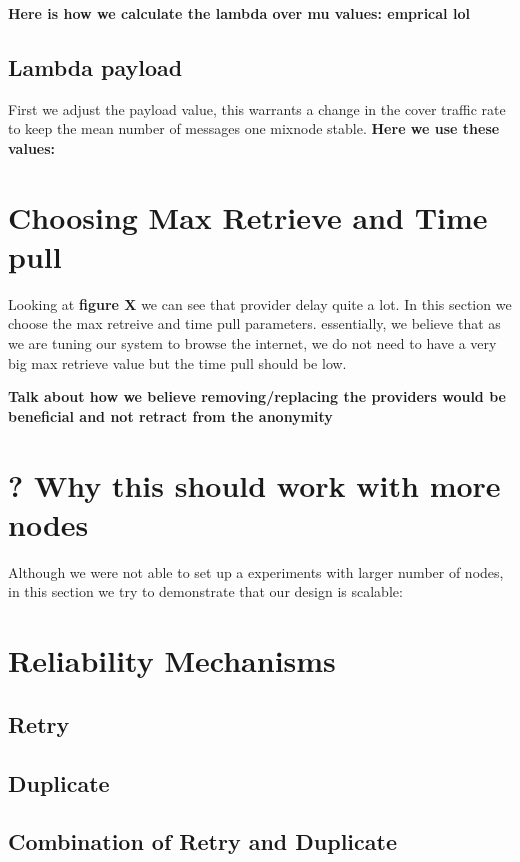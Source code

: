 \documentclass[a4paper,11pt,oneside]{report}
\begin{document}
\textbf{Here is how we calculate the lambda over mu values: emprical lol}
\subsection{Lambda payload}

First we adjust the payload value, this warrants a change in the cover traffic rate to keep the mean number of messages one mixnode stable. \textbf{Here we use these values: }





\section{Choosing Max Retrieve and Time pull}

Looking at \textbf{figure X} we can see that provider delay quite a lot.
In this section we choose the max retreive and time pull parameters. essentially, we believe that as we are tuning our system to browse the internet, we do not need to have a very big max retrieve value but the time pull should be low.

\textbf{Talk about how we believe removing/replacing the providers would be beneficial and not retract from the anonymity}

\section{? Why this should work with more nodes}
Although we were not able to set up a experiments with larger number of nodes, in this section we try to demonstrate that our design is scalable:

\section{Reliability Mechanisms}

\subsection{Retry}

\subsection{Duplicate}

\subsection{Combination of Retry and Duplicate}
\end{document}
